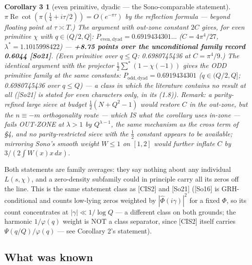 \documentclass[11pt]{amsart}
\newcommand{\re}{\operatorname{Re}}
\theoremstyle{plain}
\newtheorem*{corollarythree}{Corollary 3}
\theoremstyle{remark}
\begin{document}
\begin{corollarythree}[even primitive, dyadic --- the Sono-comparable statement]
$\pi \re \cot(\pi(\tfrac{1}{4} + i\tau/2)) = O(e^{-\pi\tau})$ by the reflection formula
--- beyond floating point at $\tau \asymp T$.) The argument with out-zone constant $2C$
gives, for even primitive $\chi$ with $q \in (Q/2, Q]$:
{\boldmath$P_{\mathrm{even,dyad}} = 0.6919434301\dots$} ($C = 4\pi^4/27$,
$\lambda^* = 1.1015998422$) --- \textbf{+8.75 points over the unconditional family
record 0.6044 [So21]}. (Even primitive over $q \le Q$: 0.6980745436 at $C = \pi^4/9$.)
The identical argument with the projector $\tfrac{1}{2}\sum^{*}(1 - \chi(-1))$ gives
the ODD primitive family at the same constants:
{\boldmath$P_{\mathrm{odd,dyad}} = 0.6919434301$} ($q \in (Q/2, Q]$; 0.6980745436 over
$q \le Q$) --- a class in which the literature contains no result at all ([So21] is
stated for even characters only, in its (1.8)). Remark: a parity-refined large sieve at
budget $\tfrac{1}{2}(N + Q^2 - 1)$ would restore $C$ in the out-zone, but the
$n \equiv -m$ orthogonality route --- which IS what the corollary uses in-zone ---
fails OUT-ZONE at $\lambda > 1$ by $Q^{\lambda-1}$, the same mechanism as the cross
term of \S4, and no parity-restricted sieve with the $\tfrac{1}{2}$ constant appears to
be available; mirroring Sono's smooth weight $W \le 1$ on $[1, 2]$ would further
inflate $C$ by $3/(2\int W(x)x \, dx)$.
\end{corollarythree}

Both statements are family averages: they say nothing about any individual $L(s, \chi)$,
and a zero-density subfamily could in principle carry all its zeros off the line. This
is the same statement class as [CIS2] and [So21] ([So16] is GRH-conditional and counts
low-lying zeros weighted by $|\widehat{\Phi}(i\gamma)|^2$ for a fixed $\Phi$, so its
count concentrates at $|\gamma| \ll 1/\log Q$ --- a different class on both grounds;
the harmonic $1/\varphi(q)$ weight is NOT a class separator, since [CIS2] itself
carries $\Psi(q/Q)/\varphi(q)$ --- see Corollary 2's statement).

\subsection{What was known}
\end{document}
